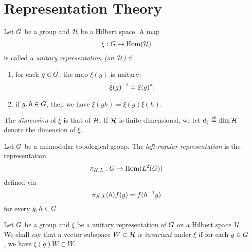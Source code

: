 \section{Representation Theory}

\begin{definition}
\label{definition:unitary_representation}
    Let $G$ be a group and $\mathcal{H}$ be a Hilbert space.
    A map
    \begin{align*}
        \xi : G \mapsto \operatorname{Hom}(\mathcal{H})
    \end{align*}
    is called a \emph{unitary representation (on $\mathcal{H}$)} if
    \begin{enumerate}
        \item for each $g \in G$, the map $\xi(g)$ is unitary:
            \begin{align*}
                {\xi(g)}^{-1} = {\xi(g)}^\star;
            \end{align*}
        \item if $g, h \in G$, then we have $\xi(g h) = \xi(g) \xi(h)$.
    \end{enumerate}

    The \emph{dimension} of $\xi$ is that of $\mathcal{H}$.
    If $\mathcal{H}$ is finite-dimensional,
    we let $\dimRep{\xi} \defeq \dim{\Hil}$ denote the dimension of $\xi$.
\end{definition}

\begin{example}
    Let $G$ be a unimodular topological group.
    The \emph{left-regular representation} is the representation
    \begin{align*}
        \pi_{K, L} : G \to \operatorname{Hom}({L^{2} (G)})
    \end{align*}
    defined via
    \begin{align*}
        \pi_{K, L}(h) f(g) = f(h^{-1} g)
    \end{align*}
    for every $g, h \in G$.
\end{example}

\begin{definition}
\label{definition:invariant_subspaces}
    Let $G$ be a group and $\xi$ be a unitary representation of $G$ on a Hilbert space $\mathcal{H}$.
    We shall say that a vector subspace $W \subset \mathcal{H}$ is \emph{invariant} under $\xi$
    if for each $g \in G$, we have $\xi(g) W \subset W$.
\end{definition}

